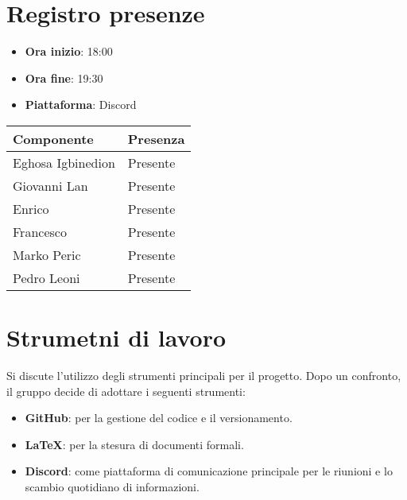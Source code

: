 \documentclass[a4paper, 12pt]{article}
\begin{document}
\section{Registro presenze}
   \begin{itemize}
        \item[] \textbf{Ora inizio}:  18:00
        \item[] \textbf{Ora fine}: 19:30
        \item[] \textbf{Piattaforma}: Discord	
    \end{itemize}
\begin{table}[!h]
    \centering
    {\renewcommand{\arraystretch}{2}
    \begin{tabularx}{\textwidth}{| X | X |}
        \hline
            \textbf{\large Componente} & 
            \textbf{\large Presenza} \\ 
        \hline 
        \hline
            Eghosa Igbinedion&
            Presente \\
        \hline 
        \hline
            Giovanni Lan&
            Presente \\
        \hline 
        \hline
            Enrico&
            Presente \\
        \hline 
        \hline
            Francesco&
            Presente \\
        \hline 
        \hline
            Marko Peric&
            Presente \\
        \hline 
        \hline
            Pedro Leoni&
            Presente \\
        \hline 

    \end{tabularx}}
\end{table}

\newpage

\section{Strumetni di lavoro}
Si discute l’utilizzo degli strumenti principali per il progetto. Dopo un confronto, il gruppo decide di adottare i seguenti strumenti:
\begin{itemize}
    \item \textbf{GitHub}: per la gestione del codice e il versionamento.
    \item \textbf{LaTeX}: per la stesura di documenti formali.
    \item \textbf{Discord}: come piattaforma di comunicazione principale per le riunioni e lo scambio quotidiano di informazioni.
\end{itemize}
\end{document}
